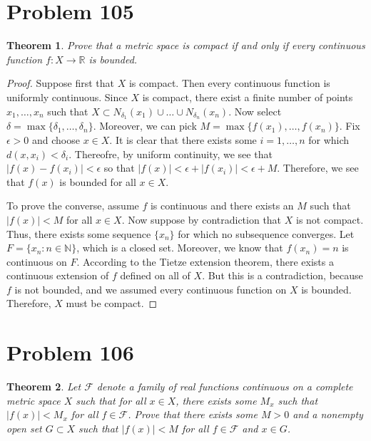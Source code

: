 \documentclass[psamsfonts]{amsart}
\newtheorem{thm}{Theorem}[section]
\theoremstyle{definition}
\theoremstyle{remark}
\numberwithin{equation}{section}
\begin{document}
\section{Problem 105}

\begin{thm}
Prove that a metric space is compact if and only if every continuous function $f: X \to \mathbb{R}$ is bounded. 
\end{thm}

\begin{proof}
Suppose first that $X$ is compact. Then every continuous function is uniformly continuous. Since $X$ is compact, there exist a finite number of points $x_1, \ldots, x_n$ such that $X \subset N_{\delta_1} (x_1) \cup \ldots \cup N_{\delta_n} (x_n)$. Now select $\delta = \max \{ \delta_1, \ldots, \delta_n \}$. Moreover, we can pick $M = \max \{ f(x_1), \ldots, f(x_n) \}$. Fix $\epsilon > 0$ and choose $x \in X$. It is clear that there exists some $i = 1, \ldots, n$ for which $d(x,x_i) < \delta_i$. Thereofre, by uniform continuity, we see that $|f(x) - f(x_i)| < \epsilon$ so that $|f(x)| < \epsilon + |f(x_i)| < \epsilon + M$. Therefore, we see that $f(x)$ is bounded for all $x \in X$. 

To prove the converse, assume $f$ is continuous and there exists an $M$ such that $|f(x)| < M$ for all $x \in X$. Now suppose by contradiction that $X$ is not compact. Thus, there exists some sequence $\{ x_n \}$ for which no subsequence converges. Let $F = \{ x_n : n \in \mathbb{N} \}$, which is a closed set. Moreover, we know that $f(x_n) = n$ is continuous on $F$. According to the Tietze extension theorem, there exists a continuous extension of $f$ defined on all of $X$. But this is a contradiction, because $f$ is not bounded, and we assumed every continuous function on $X$ is bounded. Therefore, $X$ must be compact.
\end{proof}

\section{Problem 106}

\begin{thm}
Let $\mathscr{F}$ denote a family of real functions continuous on a complete metric space $X$ such that for all $x \in X$, there exists some $M_x$ such that $|f(x)| < M_x$ for all $f \in \mathscr{F}$. Prove that there exists some $M > 0$ and a nonempty open set $G \subset X$ such that $|f(x)| < M$ for all $f \in \mathscr{F}$ and $x \in G$. 
\end{thm}
\end{document}
